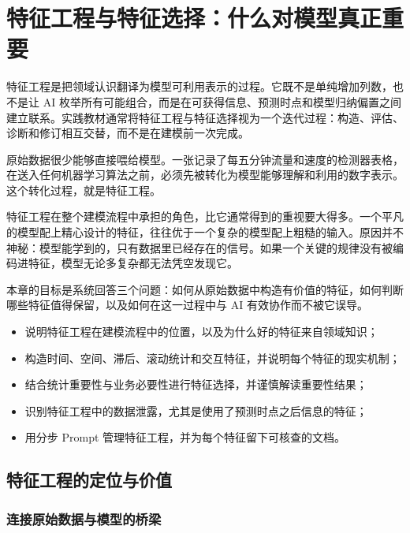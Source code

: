 ﻿\chapter{特征工程与特征选择：什么对模型真正重要}

特征工程是把领域认识翻译为模型可利用表示的过程。它既不是单纯增加列数，也不是让 AI 枚举所有可能组合，而是在可获得信息、预测时点和模型归纳偏置之间建立联系。实践教材通常将特征工程与特征选择视为一个迭代过程：构造、评估、诊断和修订相互交替，而不是在建模前一次完成\cite{kuhn2019feature}。

原始数据很少能够直接喂给模型。一张记录了每五分钟流量和速度的检测器表格，在送入任何机器学习算法之前，必须先被转化为模型能够理解和利用的数字表示。这个转化过程，就是特征工程。

特征工程在整个建模流程中承担的角色，比它通常得到的重视要大得多。一个平凡的模型配上精心设计的特征，往往优于一个复杂的模型配上粗糙的输入。原因并不神秘：模型能学到的，只有数据里已经存在的信号。如果一个关键的规律没有被编码进特征，模型无论多复杂都无法凭空发现它。

本章的目标是系统回答三个问题：如何从原始数据中构造有价值的特征，如何判断哪些特征值得保留，以及如何在这一过程中与 AI 有效协作而不被它误导。

\begin{chapterguide}
\begin{itemize}
  \item 说明特征工程在建模流程中的位置，以及为什么好的特征来自领域知识；
  \item 构造时间、空间、滞后、滚动统计和交互特征，并说明每个特征的现实机制；
  \item 结合统计重要性与业务必要性进行特征选择，并谨慎解读重要性结果；
  \item 识别特征工程中的数据泄露，尤其是使用了预测时点之后信息的特征；
  \item 用分步 Prompt 管理特征工程，并为每个特征留下可核查的文档。
\end{itemize}
\end{chapterguide}


\section{特征工程的定位与价值}

\subsection{连接原始数据与模型的桥梁}

